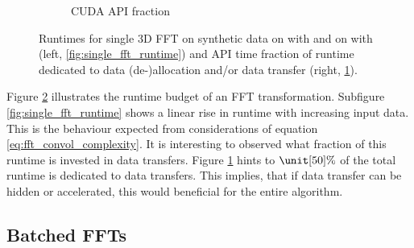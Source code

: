 \begin{figure}[h]
\begin{subfigure}[b]{0.45\textwidth}
    \caption{CUDA API fraction}
    \label{fig:single_fft_api_fraction}
  \end{subfigure}
  \hfill
  \caption{Runtimes for single 3D FFT on synthetic data on \cpu{} with \fftw{} and on \gpu{} with \cufft{} (left, \ref{fig:single_fft_runtime}) and API time fraction of runtime dedicated to data (de-)allocation and/or data transfer (right, \ref{fig:single_fft_api_fraction}).}
  \label{fig:rt_single_fft}
\end{figure}

Figure \ref{fig:rt_single_fft} illustrates the runtime budget of an FFT transformation. Subfigure \ref{fig:single_fft_runtime} shows a linear rise in runtime with increasing input data. This is the behaviour expected from considerations of equation \ref{eq:fft_convol_complexity}. It is interesting to observed what fraction of this runtime is invested in data transfers. Figure \ref{fig:single_fft_api_fraction} hints to $\unit[50]{\%}$ of the total runtime is dedicated to data transfers. This implies, that if data transfer can be hidden or accelerated, this would beneficial for the entire algorithm.

\subsection{Batched FFTs}